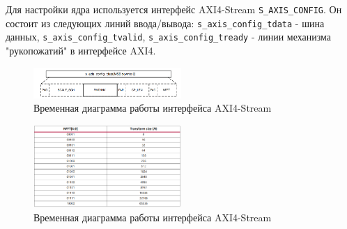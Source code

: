 Для настройки ядра используется интерфейс AXI4-Stream \verb|S_AXIS_CONFIG|. 
Он состоит из следующих линий ввода/вывода: \verb|s_axis_config_tdata| - шина данных,
\verb|s_axis_config_tvalid|, \verb|s_axis_config_tready| - линии механизма "рукопожатий" в интерфейсе AXI4.

\begin{figure}[h]
	\centering
	\includegraphics[width=0.5\textwidth]{image/FFT_AXIS_CONFIG.png}
	\caption{Временная диаграмма работы интерфейса AXI4-Stream}
	\label{fft_detailed_implem}
\end{figure}

\begin{figure}[h]
	\centering
	\includegraphics[width=0.5\textwidth]{image/FFT_LENGTH.PNG}
	\caption{Временная диаграмма работы интерфейса AXI4-Stream}
	\label{fft_detailed_implem}
\end{figure}

